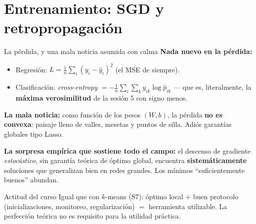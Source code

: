 \documentclass{beamer}
\newcommand{\1}{\mathbb{I}}
\begin{document}
\section{Entrenamiento: SGD y retropropagación}
\begin{frame}[noframenumbering]
\tableofcontents[currentsection]
\end{frame}

\begin{frame}{La pérdida, y una mala noticia asumida con calma}
\small
\textbf{Nada nuevo en la pérdida:}
\begin{itemize}\itemsep3pt
  \item Regresión: $L = \frac{1}{n}\sum_i (y_i - \hat{y}_i)^2$ (el MSE de siempre).
  \item Clasificación: \emph{cross-entropy} $= -\frac{1}{n}\sum_i \sum_k y_{ik} \log \hat{p}_{ik}$ --- que es, literalmente, la \textbf{máxima verosimilitud} de la sesión 5 con signo menos.
\end{itemize}
\pause

\vspace{0.2cm}
\textbf{La mala noticia:} como función de los pesos $(W, b)$, la pérdida \textbf{no es convexa}: paisaje lleno de valles, mesetas y puntos de silla. Adiós garantías globales tipo Lasso.
\pause

\vspace{0.15cm}
\textbf{La sorpresa empírica que sostiene todo el campo:} el descenso de gradiente \emph{estocástico}, sin garantía teórica de óptimo global, encuentra \textbf{sistemáticamente} soluciones que generalizan bien en redes grandes. Los mínimos ``suficientemente buenos'' abundan.
\pause

\vspace{0.15cm}
\begin{block}{Actitud del curso}
Igual que con $k$-means (S7): óptimo local $+$ buen protocolo (inicializaciones, monitoreo, regularización) $=$ herramienta utilizable. La perfección teórica no es requisito para la utilidad práctica.
\end{block}
\end{frame}
\end{document}
